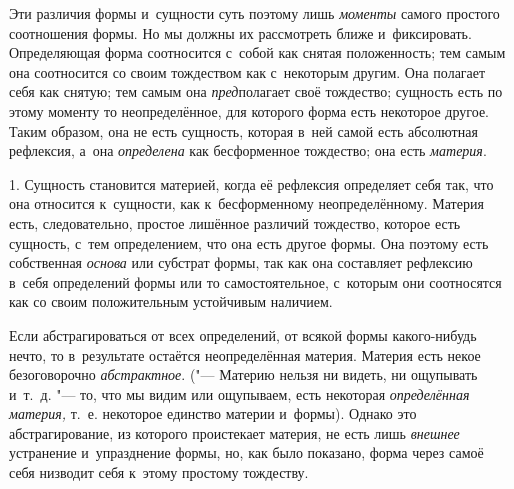 Эти различия формы и~сущности суть поэтому лишь {\em моменты} самого простого
соотношения формы. Но мы должны их рассмотреть ближе и~фиксировать.
Определяющая форма соотносится с~собой как снятая положенность; тем самым она
соотносится со своим тождеством как с~некоторым другим. Она полагает себя как
снятую; тем самым она {\em пред}полагает своё тождество; сущность есть по этому
моменту то неопределённое, для которого форма есть некоторое другое. Таким
образом, она не есть сущность, которая в~ней самой есть абсолютная рефлексия,
а~она {\em определена} как бесформенное тождество; она есть {\em материя}.


1. Сущность становится материей, когда её рефлексия определяет себя так, что
она относится к~сущности, как к~бесформенному неопределённому. Материя есть,
следовательно, простое лишённое различий тождество, которое есть сущность,
с~тем определением, что она есть другое формы. Она поэтому есть собственная
{\em основа} или субстрат формы, так как она составляет рефлексию в~себя
определений формы или то самостоятельное, с~которым они соотносятся как со
своим положительным устойчивым наличием.

Если абстрагироваться от всех определений, от всякой формы какого-нибудь нечто,
то в~результате остаётся неопределённая материя. Материя есть некое
безоговорочно {\em абстрактное}. ("--- Материю нельзя ни видеть, ни ощупывать
и~т.~д. "--- то, что мы видим или ощупываем, есть некоторая {\em определённая
материя,} т.~е. некоторое единство материи и~формы). Однако это
абстрагирование, из которого проистекает материя, не есть лишь {\em внешнее}
устранение и~упразднение формы, но, как было показано, форма через самоё себя
низводит себя к~этому простому тождеству.

